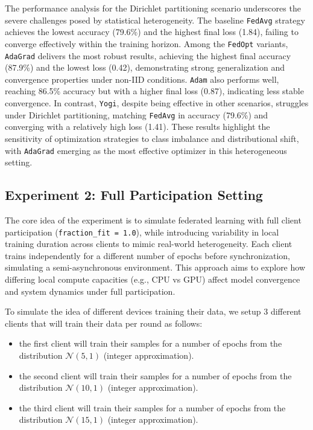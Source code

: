 \documentclass[11pt]{article}
\begin{document}
    The performance analysis for the Dirichlet partitioning scenario underscores the severe challenges posed by statistical heterogeneity. The baseline \texttt{FedAvg} strategy achieves the lowest accuracy (79.6\%) and the highest final loss (1.84), failing to converge effectively within the training horizon. Among the \texttt{FedOpt} variants, \texttt{AdaGrad} delivers the most robust results, achieving the highest final accuracy (87.9\%) and the lowest loss (0.42), demonstrating strong generalization and convergence properties under non-IID conditions. \texttt{Adam} also performs well, reaching 86.5\% accuracy but with a higher final loss (0.87), indicating less stable convergence. In contrast, \texttt{Yogi}, despite being effective in other scenarios, struggles under Dirichlet partitioning, matching \texttt{FedAvg} in accuracy (79.6\%) and converging with a relatively high loss (1.41). These results highlight the sensitivity of optimization strategies to class imbalance and distributional shift, with \texttt{AdaGrad} emerging as the most effective optimizer in this heterogeneous setting.

    \subsection{Experiment 2: Full Participation Setting}
    \label{subsec:experiment2}

    The core idea of the experiment is to simulate federated learning with full client participation (\texttt{fraction\_fit = 1.0}), while introducing variability in local training duration across clients to mimic real-world heterogeneity. Each client trains independently for a different number of epochs before synchronization, simulating a semi-asynchronous environment. This approach aims to explore how differing local compute capacities (e.g., CPU vs GPU) affect model convergence and system dynamics under full participation.

    To simulate the idea of different devices training their data, we setup 3 different clients that will train their data per round as follows:
    \begin{itemize}
        \item the first client will train their samples for a number of epochs from the distribution $\mathcal{N}(5, 1)$ (integer approximation).
        \item the second client will train their samples for a number of epochs from the distribution $\mathcal{N}(10, 1)$ (integer approximation).
        \item the third client will train their samples for a number of epochs from the distribution $\mathcal{N}(15, 1)$ (integer approximation).
    \end{itemize}
\end{document}
